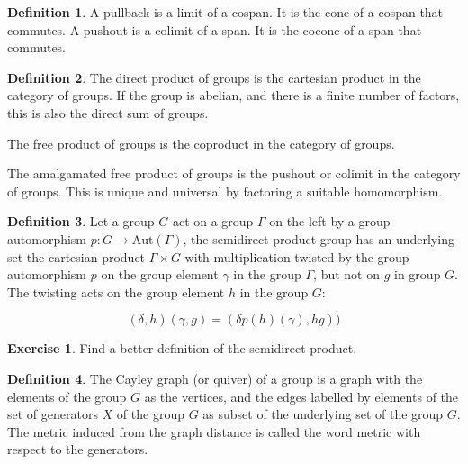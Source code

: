 \documentclass[10pt]{article}
\theoremstyle{plain}%
\theoremstyle{definition}
\newtheorem{definition}{Definition}[section]
\newtheorem{exercise}{Exercise}[section]
\theoremstyle{remark}
\begin{document}
\begin{definition}
	A pullback is a limit of a cospan. It is the cone of a cospan that commutes. 
	A pushout is a colimit of a span. It is the cocone of a span that commutes. 
\end{definition}

\begin{definition}
	The direct product of groups is the cartesian product in the category of groups. If the group is abelian, and there is a finite number of factors, this is also the direct sum of groups.

	The free product of groups is the coproduct in the category of groups.

	The amalgamated free product of groups is the pushout or colimit in the category of groups. This is unique and universal by factoring a suitable homomorphism.
\end{definition}

\begin{definition}
	Let a group $G$ act on a group $\Gamma$ on the left by a group automorphism $p : G \rightarrow \mathrm{Aut}(\Gamma)$, the semidirect product group has an underlying set the cartesian product $\Gamma \times G$ with multiplication twisted by the group automorphism $p$ on the group element $\gamma$ in the group $\Gamma$, but not on $g$ in group $G$. The twisting acts on the group element $h$ in the group $G$:

	\begin{equation}
		(\delta, h)(\gamma, g)
		= (\delta p(h)(\gamma), hg))
	\end{equation}
\end{definition}

\begin{exercise}
	Find a better definition of the semidirect product.
\end{exercise}

\begin{definition}
	The Cayley graph (or quiver) of a group is a graph with the elements of the group $G$ as the vertices, and the edges labelled by elements of the set of generators $X$ of the group $G$ as subset of the underlying set of the group $G$. The metric induced from the graph distance is called the word metric with respect to the generators.
\end{definition}
\end{document}
